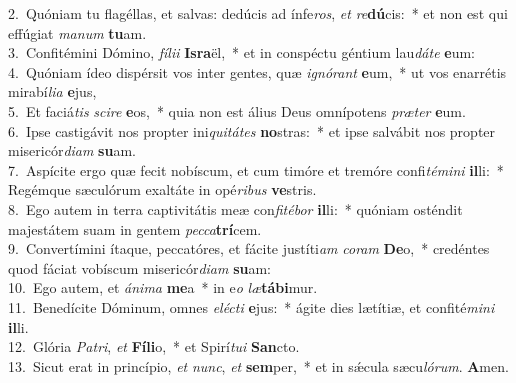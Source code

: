 {2.~}Quóniam tu flagéllas, et salvas: dedúcis ad ínfe\textit{ros}, \textit{et} \textit{re}\textbf{dú}cis:~* et non est qui effúgiat \textit{ma}\textit{num} \textbf{tu}am.\\
{3.~}Confitémini Dómino, \textit{fí}\textit{li}\textit{i} \textbf{Is}\textbf{ra}ël,~* et in conspéctu géntium lau\textit{dá}\textit{te} \textbf{e}um:\\
{4.~}Quóniam ídeo dispérsit vos inter gentes, quæ \textit{i}\textit{gnó}\textit{rant} \textbf{e}um,~* ut vos enarrétis mirabí\textit{li}\textit{a} \textbf{e}jus,\\
{5.~}Et faciá\textit{tis} \textit{sci}\textit{re} \textbf{e}os,~* quia non est álius Deus omnípotens \textit{præ}\textit{ter} \textbf{e}um.\\
{6.~}Ipse castigávit nos propter ini\textit{qui}\textit{tá}\textit{tes} \textbf{no}stras:~* et ipse salvábit nos propter misericór\textit{di}\textit{am} \textbf{su}am.\\
{7.~}Aspícite ergo quæ fecit nobíscum, et cum timóre et tremóre confi\textit{té}\textit{mi}\textit{ni} \textbf{il}li:~* Regémque sæculórum exaltáte in opé\textit{ri}\textit{bus} \textbf{ve}stris.\\
{8.~}Ego autem in terra captivitátis meæ con\textit{fi}\textit{té}\textit{bor} \textbf{il}li:~* quóniam osténdit majestátem suam in gentem \textit{pec}\textit{ca}\textbf{trí}cem.\\
{9.~}Convertímini ítaque, peccatóres, et fácite justíti\textit{am} \textit{co}\textit{ram} \textbf{De}o,~* credéntes quod fáciat vobíscum misericór\textit{di}\textit{am} \textbf{su}am:\\
{10.~}Ego autem, et \textit{á}\textit{ni}\textit{ma} \textbf{me}a~* in e\textit{o} \textit{læ}\textbf{tá}\textbf{bi}mur.\\
{11.~}Benedícite Dóminum, omnes \textit{e}\textit{lé}\textit{cti} \textbf{e}jus:~* ágite dies lætítiæ, et confité\textit{mi}\textit{ni} \textbf{il}li.\\
{12.~}Glória \textit{Pa}\textit{tri}, \textit{et} \textbf{Fí}\textbf{li}o,~* et Spirí\textit{tu}\textit{i} \textbf{San}cto.\\
{13.~}Sicut erat in princípio, \textit{et} \textit{nunc}, \textit{et} \textbf{sem}per,~* et in sǽcula sæcu\textit{ló}\textit{rum}. \textbf{A}men.\\
